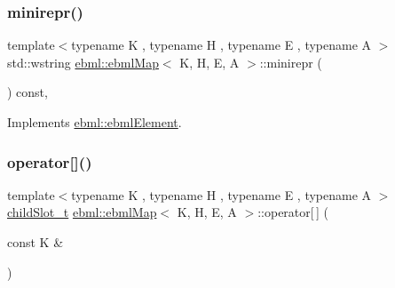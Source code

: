 \mbox{\label{classebml_1_1ebmlMap_a44366a7b060c58b3fbe4e65c31481efc}} 
\subsubsection{\texorpdfstring{minirepr()}{minirepr()}}
{\footnotesize\ttfamily template$<$typename K , typename H , typename E , typename A $>$ \\
std\+::wstring \mbox{\hyperlink{classebml_1_1ebmlMap}{ebml\+::ebml\+Map}}$<$ K, H, E, A $>$\+::minirepr (\begin{DoxyParamCaption}{ }\end{DoxyParamCaption}) const\hspace{0.3cm}{\ttfamily [override]}, {\ttfamily [virtual]}}



Implements \mbox{\hyperlink{classebml_1_1ebmlElement_a7852173aeef78bd843939ae5a82f1d1c}{ebml\+::ebml\+Element}}.

\mbox{\label{classebml_1_1ebmlMap_aec9056894cff0152fd12b95d17af605b}} 
\subsubsection{\texorpdfstring{operator[]()}{operator[]()}}
{\footnotesize\ttfamily template$<$typename K , typename H , typename E , typename A $>$ \\
\mbox{\hyperlink{classebml_1_1childSlot__t}{child\+Slot\+\_\+t}} \mbox{\hyperlink{classebml_1_1ebmlMap}{ebml\+::ebml\+Map}}$<$ K, H, E, A $>$\+::operator\mbox{[}$\,$\mbox{]} (\begin{DoxyParamCaption}\item[{const K \&}]{ }\end{DoxyParamCaption})}

\mbox{\label{classebml_1_1ebmlMap_a1d95a8dbda99fb485977f18f0e5ed992}} 
